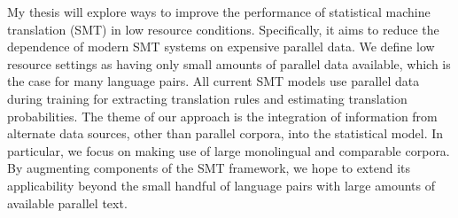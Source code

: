 My thesis will explore ways to improve the performance of statistical machine translation (SMT) in low resource conditions. Specifically, it aims to reduce
 the dependence of modern SMT systems on expensive parallel data. We define low
 resource settings as having only small amounts of parallel data available,
 which is the case for many language pairs. All current SMT models use parallel
 data during training for extracting translation rules and estimating
 translation probabilities. The theme of our approach is the integration of
 information from alternate data sources, other than parallel corpora, into the
 statistical model. In particular, we focus on making use of large monolingual
 and comparable corpora. By augmenting components of the SMT framework, we hope
 to extend its applicability beyond the small handful of language pairs with
 large amounts of available parallel text.

